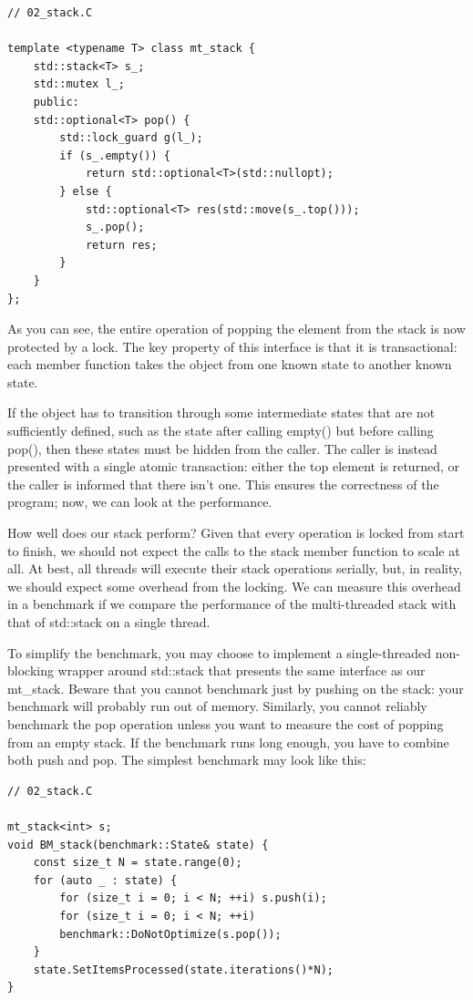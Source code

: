 \begin{lstlisting}[style=styleCXX]
// 02_stack.C 

template <typename T> class mt_stack {
	std::stack<T> s_;
	std::mutex l_;
	public:
	std::optional<T> pop() {
		std::lock_guard g(l_);
		if (s_.empty()) {
			return std::optional<T>(std::nullopt);
		} else {
			std::optional<T> res(std::move(s_.top()));
			s_.pop();
			return res;
		}
	}
};
\end{lstlisting}

As you can see, the entire operation of popping the element from the stack is now protected by a lock. The key property of this interface is that it is transactional: each member function takes the object from one known state to another known state.

If the object has to transition through some intermediate states that are not sufficiently defined, such as the state after calling empty() but before calling pop(), then these states must be hidden from the caller. The caller is instead presented with a single atomic transaction: either the top element is returned, or the caller is informed that there isn't one. This ensures the correctness of the program; now, we can look at the performance.


How well does our stack perform? Given that every operation is locked from start to finish, we should not expect the calls to the stack member function to scale at all. At best, all threads will execute their stack operations serially, but, in reality, we should expect some overhead from the locking. We can measure this overhead in a benchmark if we compare the performance of the multi-threaded stack with that of std::stack on a single thread.

To simplify the benchmark, you may choose to implement a single-threaded non-blocking wrapper around std::stack that presents the same interface as our mt\_stack. Beware that you cannot benchmark just by pushing on the stack: your benchmark will probably run out of memory.  Similarly, you cannot reliably benchmark the pop operation unless you want to measure the cost of popping from an empty stack. If the benchmark runs long enough, you have to combine both push and pop. The simplest benchmark may look like this:

\begin{lstlisting}[style=styleCXX]
// 02_stack.C 
	
mt_stack<int> s;
void BM_stack(benchmark::State& state) {
	const size_t N = state.range(0);
	for (auto _ : state) {
		for (size_t i = 0; i < N; ++i) s.push(i);
		for (size_t i = 0; i < N; ++i)
		benchmark::DoNotOptimize(s.pop());
	}
	state.SetItemsProcessed(state.iterations()*N);
}
\end{lstlisting}

